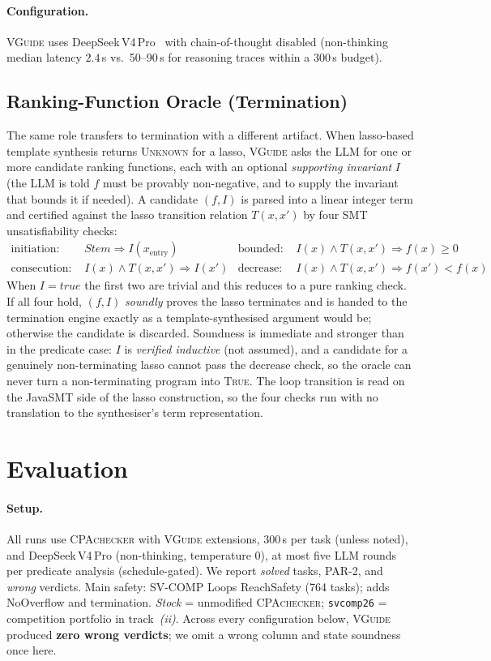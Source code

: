 \documentclass[runningheads]{llncs}
\newcommand{\tool}{\textsc{VGuide}}
\newcommand{\cpa}{\textsc{CPAchecker}}
\newcommand{\llm}{DeepSeek\,V4\,Pro}
\begin{document}
\paragraph{Configuration.} \tool{} uses \llm~\cite{deepseekv4} with chain-of-thought disabled (non-thinking
median latency $2.4$\,s vs.\ 50--90\,s for reasoning traces within a 300\,s budget).

\subsection{Ranking-Function Oracle (Termination)}
\label{sec:rank}

The same role transfers to termination with a different artifact. When lasso-based template
synthesis returns \textsc{Unknown} for a lasso, \tool{} asks the LLM for one or more candidate
ranking functions, each with an optional \emph{supporting invariant} $I$ (the LLM is told $f$
must be provably non-negative, and to supply the invariant that bounds it if needed). A
candidate $(f,I)$ is parsed into a linear integer term and certified against the lasso
transition relation $T(x,x')$ by four SMT unsatisfiability checks:
\begin{align*}
\text{initiation: } &\textit{Stem}\Rightarrow I(x_{\text{entry}}) &
\text{bounded: } &I(x)\wedge T(x,x')\Rightarrow f(x)\ge 0\\
\text{consecution: } &I(x)\wedge T(x,x')\Rightarrow I(x') &
\text{decrease: } &I(x)\wedge T(x,x')\Rightarrow f(x')<f(x)
\end{align*}
When $I=\mathit{true}$ the first two are trivial and this reduces to a pure ranking check. If
all four hold, $(f,I)$ \emph{soundly} proves the lasso terminates and is handed to the
termination engine exactly as a template-synthesised argument would be; otherwise the
candidate is discarded. Soundness is immediate and stronger than in the predicate case: $I$
is \emph{verified inductive} (not assumed), and a candidate for a genuinely non-terminating
lasso cannot pass the decrease check, so the oracle can never turn a non-terminating program
into \textsc{True}. The loop transition is read on the JavaSMT side of the lasso construction,
so the four checks run with no translation to the synthesiser's term representation.

\section{Evaluation}
\label{sec:eval}

\paragraph{Setup.} All runs use \cpa{} with \tool{} extensions, 300\,s per task (unless noted),
and \llm{} (non-thinking, temperature 0), at most five LLM rounds per predicate analysis
(schedule-gated). We report \emph{solved} tasks, PAR-2, and \emph{wrong} verdicts. Main safety:
SV-COMP Loops ReachSafety (764 tasks);  adds NoOverflow and termination.
\emph{Stock} = unmodified \cpa{}; \texttt{svcomp26} = competition portfolio in track~\emph{(ii)}.
Across every configuration below, \tool{} produced \textbf{zero wrong verdicts}; we omit a
wrong column and state soundness once here.
\end{document}

